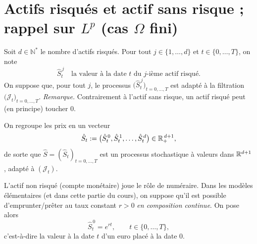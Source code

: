 \section{Actifs risqués et actif sans risque ; rappel sur $L^p$ (cas $\Omega$ fini)}

\begin{definition}
Soit $d\in\mathbb{N}^*$ le nombre d'actifs risqués. Pour tout $j\in\{1,\dots,d\}$ et
$t\in\{0,\dots,T\}$, on note
\begin{equation}
\hat S_t^{\,j}\quad\text{la valeur à la date }t\text{ du $j$-ième actif risqué.}
\end{equation}
On suppose que, pour tout $j$, le processus $\big(\hat S_t^{\,j}\big)_{t=0,\dots,T}$ est adapté à la
filtration $\big(\mathcal{J}_t\big)_{t=0,\dots,T}$. \emph{Remarque.} Contrairement à l'actif sans risque,
un actif risqué peut (en principe) toucher $0$.
\end{definition}

\begin{definition}
On regroupe les prix en un vecteur
\begin{equation}
\hat S_t:=\big(\hat S_t^{\,0},\hat S_t^{\,1},\dots,\hat S_t^{\,d}\big)\in\mathbb{R}_+^{\,d+1},
\end{equation}
de sorte que $\hat S=(\hat S_t)_{t=0,\dots,T}$ est un processus stochastique à valeurs dans $\mathbb{R}^{d+1}$, adapté à
$(\mathcal{J}_t)$.
\end{definition}

\begin{definition}
L'actif non risqué (compte monétaire) joue le rôle de numéraire. Dans les modèles élémentaires
(et dans cette partie du cours), on suppose qu'il est possible d'emprunter/prêter au taux
constant $r>0$ \emph{en composition continue}. On pose alors
\begin{equation}
\hat S_t^{\,0}=e^{rt},\qquad t\in\{0,\dots,T\},
\end{equation}
c'est-à-dire la valeur à la date $t$ d'un euro placé à la date $0$.
\end{definition}

\bigskip
